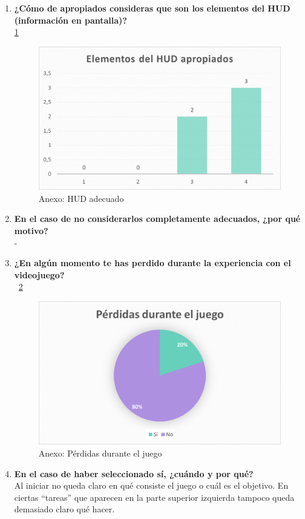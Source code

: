 \documentclass[12pt, a4paper,twoside,titlepage]{book}
\begin{document}
\begin{enumerate}[label=\textbf{\arabic*}.]
	 \item \textbf{¿Cómo de apropiados consideras que son los elementos del HUD (información en pantalla)?}\\	
		\ref{fig:anexHUD}
	\begin{figure}
	 	\centering
	 	\includegraphics[width=.8\linewidth]{Anexo Demo/5AnexDemo_HUD}
	 	\caption{Anexo: HUD adecuado}
	 	\label{fig:anexHUD}
	 \end{figure}
	 
	 \item \textbf{En el caso de no considerarlos completamente adecuados, ¿por qué motivo?}\\
	 	- 
	 
	 \item \textbf{¿En algún momento te has perdido durante la experiencia con el videojuego?}\\
	~\ref{fig:anexPerdi}
	 	 \begin{figure}
	 	\centering
	 	\includegraphics[width=.8\linewidth]{Anexo Demo/6AnexDemo_perdido}
	 	\caption{Anexo: Pérdidas durante el juego}
	 	\label{fig:anexPerdi}
	 \end{figure}
 
	 \item \textbf{En el caso de haber seleccionado sí, ¿cuándo y por qué?}\\
		Al iniciar no queda claro en qué consiste el juego o cuál es el objetivo. En ciertas ``tareas'' que aparecen en la parte superior izquierda tampoco queda demasiado claro qué hacer.
	 

\end{enumerate}
\end{document}
